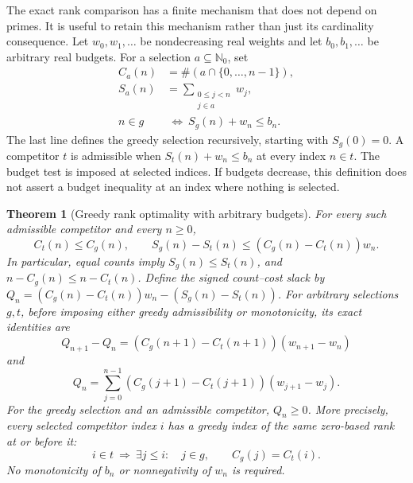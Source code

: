 \documentclass[11pt]{article}
\newtheorem{theorem}{Theorem}[section]
\theoremstyle{definition}
\begin{document}
The exact rank comparison has a finite mechanism that does not
depend on primes.  It is useful to retain this mechanism rather
than just its cardinality consequence.  Let $w_0,w_1,\ldots$ be
nondecreasing real weights and let $b_0,b_1,\ldots$ be arbitrary
real budgets.  For a selection $a\subseteq\mathbb N_0$, set
\begin{equation}
 \begin{aligned}
 C_a(n)&=\#(a\cap\{0,\ldots,n-1\}),\\
 S_a(n)&=\sum_{\substack{0\le j<n\\j\in a}}w_j,\\
 n\in g&\ \Longleftrightarrow\ S_g(n)+w_n\le b_n .
 \end{aligned}
 \label{eq:ordered-stream-greedy-ledger}
\end{equation}
The last line defines the greedy selection recursively, starting
with $S_g(0)=0$.  A competitor $t$ is admissible when
$S_t(n)+w_n\le b_n$ at every index $n\in t$.
The budget test is imposed at selected indices.  If budgets
decrease, this definition does not assert a budget inequality at
an index where nothing is selected.

\begin{theorem}[Greedy rank optimality with arbitrary budgets]
\label{thm:ordered-stream-greedy-optimality}
For every such admissible competitor and every $n\ge0$,
\[
 C_t(n)\le C_g(n),\qquad
 S_g(n)-S_t(n)\le (C_g(n)-C_t(n))w_n .
\]
In particular, equal counts imply $S_g(n)\le S_t(n)$, and
$n-C_g(n)\le n-C_t(n)$.
Define the signed count--cost slack by
$Q_n=(C_g(n)-C_t(n))w_n-(S_g(n)-S_t(n))$.
For arbitrary selections $g,t$, before imposing either greedy
admissibility or monotonicity, its exact identities are
\begin{equation}
 Q_{n+1}-Q_n
   =(C_g(n+1)-C_t(n+1))(w_{n+1}-w_n)
 \label{eq:ordered-stream-greedy-slack}
\end{equation}
and
\begin{equation}
 Q_n=\sum_{j=0}^{n-1}
       (C_g(j+1)-C_t(j+1))(w_{j+1}-w_j).
 \label{eq:ordered-stream-greedy-abel}
\end{equation}
For the greedy selection and an admissible competitor,
$Q_n\ge0$.  More precisely, every selected competitor index $i$
has a greedy index of the same zero-based rank at or before it:
\begin{equation}
 i\in t\ \Longrightarrow\
 \exists j\le i:\quad j\in g,\qquad C_g(j)=C_t(i).
 \label{eq:ordered-stream-greedy-rank}
\end{equation}
No monotonicity of $b_n$ or nonnegativity of $w_n$ is required.
\end{theorem}
\end{document}
